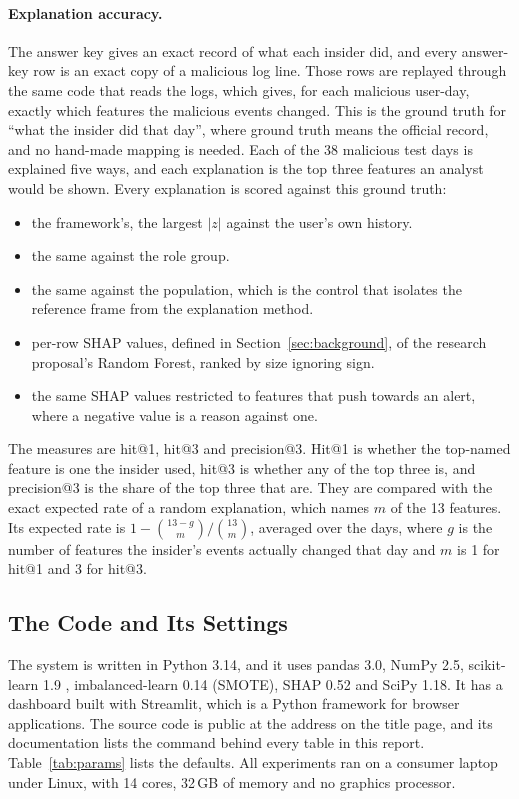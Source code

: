 \documentclass[a4paper,12pt]{article}
\begin{document}
\paragraph{Explanation accuracy.} The answer key gives an exact record of what each insider did, and every answer-key row is an exact copy of a malicious log line. Those rows are replayed through the same code that reads the logs, which gives, for each malicious user-day, exactly which features the malicious events changed. This is the ground truth for ``what the insider did that day'', where ground truth means the official record, and no hand-made mapping is needed. Each of the 38 malicious test days is explained five ways, and each explanation is the top three features an analyst would be shown. Every explanation is scored against this ground truth:
\begin{itemize}
   \item the framework's, the largest $|z|$ against the user's own history.
   \item the same against the role group.
   \item the same against the population, which is the control that isolates the reference frame from the explanation method.
   \item per-row SHAP values, defined in Section~\ref{sec:background}, of the research proposal's Random Forest, ranked by size ignoring sign.
   \item the same SHAP values restricted to features that push towards an alert, where a negative value is a reason against one.
\end{itemize}
The measures are hit@1, hit@3 and precision@3. Hit@1 is whether the top-named feature is one the insider used, hit@3 is whether any of the top three is, and precision@3 is the share of the top three that are. They are compared with the exact expected rate of a random explanation, which names $m$ of the 13 features. Its expected rate is $1 - \binom{13-g}{m}/\binom{13}{m}$, averaged over the days, where $g$ is the number of features the insider's events actually changed that day and $m$ is 1 for hit@1 and 3 for hit@3.

\subsection{The Code and Its Settings}
\label{sec:implementation}
The system is written in Python 3.14, and it uses pandas 3.0, NumPy 2.5, scikit-learn 1.9 \cite{Pedregosa2011}, imbalanced-learn 0.14 (SMOTE), SHAP 0.52 and SciPy 1.18. It has a dashboard built with Streamlit, which is a Python framework for browser applications. The source code is public at the address on the title page, and its documentation lists the command behind every table in this report. Table~\ref{tab:params} lists the defaults. All experiments ran on a consumer laptop under Linux, with 14 cores, 32\,GB of memory and no graphics processor.
\end{document}
